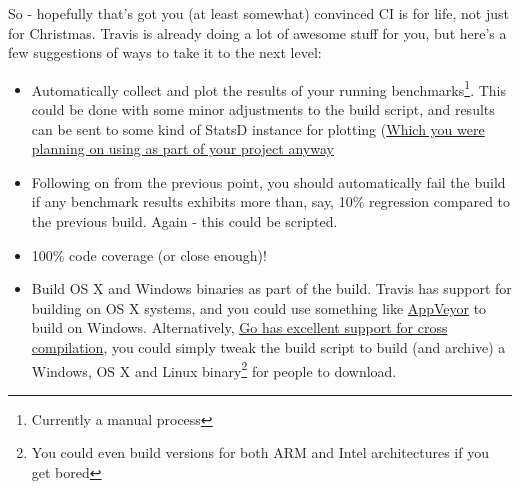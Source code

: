 So - hopefully that's got you (at least somewhat) convinced CI is for life, not
just for Christmas. Travis is already doing a lot of awesome stuff for you, but
here's a few suggestions of ways to take it to the next level:

\begin{itemize}
  \item Automatically collect and plot the results of your running benchmarks\footnote{Currently a manual process}.
  This could be done with some minor adjustments to the build script, and results
  can be sent to some kind of StatsD instance for plotting
  (\href{https://github.com/FireEater64/grafana-statsd-influxdb-docker}{Which you
  were planning on using as part of your project anyway}
  \item Following on from the previous point, you should automatically fail the
  build if any benchmark results exhibits more than, say, 10\% regression compared
  to the previous build. Again - this could be scripted.
  \item 100\% code coverage (or close enough)!
  \item Build OS X and Windows binaries as part of the build. Travis has support
  for building on OS X systems, and you could use something like
  \href{http://www.appveyor.com/}{AppVeyor} to build on Windows. Alternatively,
  \href{http://dave.cheney.net/2015/08/22/cross-compilation-with-go-1-5}{Go
  has excellent support for cross compilation}, you could simply tweak the build
  script to build (and archive) a Windows, OS X and Linux
  binary\footnote{You could even build versions for both ARM and Intel architectures if you get bored} for
  people to download.
\end{itemize}
